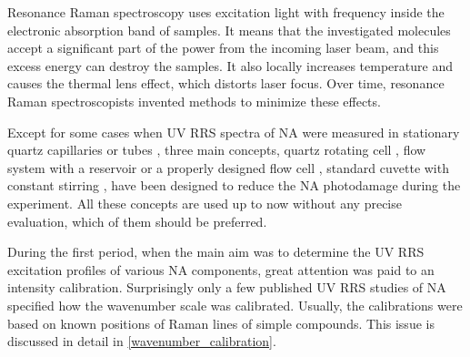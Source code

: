 Resonance Raman spectroscopy uses excitation light with frequency inside the
electronic absorption band of samples.
It means that the investigated molecules accept a significant part of the power
from the incoming laser beam, and this excess energy can destroy the samples.
It also locally increases temperature and causes the thermal lens effect, which
distorts laser focus.
Over time, resonance Raman spectroscopists invented methods to minimize these
effects.

Except for some cases when UV RRS spectra of NA were measured in stationary
quartz capillaries or tubes
\parencite{%
	Blazej1977,%
	Asher1983%
},
three main concepts, quartz rotating cell
\parencite{%
	Kiefer1971,%
	Kiefer1971a,%
},
flow system with a reservoir
\parencite{Ziegler1981}
or a properly designed flow cell
\parencite{Blazej1980},
standard cuvette with constant stirring
\parencite{Jolles1984},
have been designed to reduce the NA photodamage during the
experiment.
All these concepts are used up to now without any precise evaluation, which of
them should be preferred.

During the first period, when the main aim was to determine the UV RRS
excitation profiles of various NA components, great attention was paid to an
intensity calibration.
Surprisingly only a few published UV RRS studies of NA specified how the
wavenumber scale was calibrated.
Usually, the calibrations were based on known positions of Raman lines of
simple compounds.
This issue is discussed in detail in
\cref{wavenumber_calibration}.

